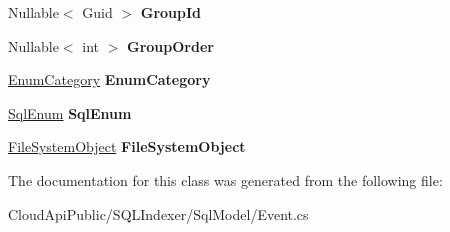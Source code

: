 \begin{DoxyCompactItemize}
\item 
\hypertarget{class_cloud_api_public_1_1_s_q_l_indexer_1_1_sql_model_1_1_event_a6db816514f8217e6617b8f7c7d1d08bb}{Nullable$<$ Guid $>$ {\bfseries Group\-Id}}\label{class_cloud_api_public_1_1_s_q_l_indexer_1_1_sql_model_1_1_event_a6db816514f8217e6617b8f7c7d1d08bb}

\item 
\hypertarget{class_cloud_api_public_1_1_s_q_l_indexer_1_1_sql_model_1_1_event_abeaf55a2f4d4029a7f22783cce1fe6fa}{Nullable$<$ int $>$ {\bfseries Group\-Order}}\label{class_cloud_api_public_1_1_s_q_l_indexer_1_1_sql_model_1_1_event_abeaf55a2f4d4029a7f22783cce1fe6fa}

\item 
\hypertarget{class_cloud_api_public_1_1_s_q_l_indexer_1_1_sql_model_1_1_event_a09465104438f5e21b17dad7bc4180422}{\hyperlink{class_cloud_api_public_1_1_s_q_l_indexer_1_1_sql_model_1_1_enum_category}{Enum\-Category} {\bfseries Enum\-Category}}\label{class_cloud_api_public_1_1_s_q_l_indexer_1_1_sql_model_1_1_event_a09465104438f5e21b17dad7bc4180422}

\item 
\hypertarget{class_cloud_api_public_1_1_s_q_l_indexer_1_1_sql_model_1_1_event_a508d39ae5db5d2092f6c14a59966d903}{\hyperlink{class_cloud_api_public_1_1_s_q_l_indexer_1_1_sql_model_1_1_sql_enum}{Sql\-Enum} {\bfseries Sql\-Enum}}\label{class_cloud_api_public_1_1_s_q_l_indexer_1_1_sql_model_1_1_event_a508d39ae5db5d2092f6c14a59966d903}

\item 
\hypertarget{class_cloud_api_public_1_1_s_q_l_indexer_1_1_sql_model_1_1_event_af7c221c2e55c1f7cde564f0e808d9ebe}{\hyperlink{class_cloud_api_public_1_1_s_q_l_indexer_1_1_sql_model_1_1_file_system_object}{File\-System\-Object} {\bfseries File\-System\-Object}}\label{class_cloud_api_public_1_1_s_q_l_indexer_1_1_sql_model_1_1_event_af7c221c2e55c1f7cde564f0e808d9ebe}

\end{DoxyCompactItemize}


The documentation for this class was generated from the following file\-:\begin{DoxyCompactItemize}
\item 
Cloud\-Api\-Public/\-S\-Q\-L\-Indexer/\-Sql\-Model/Event.\-cs\end{DoxyCompactItemize}
